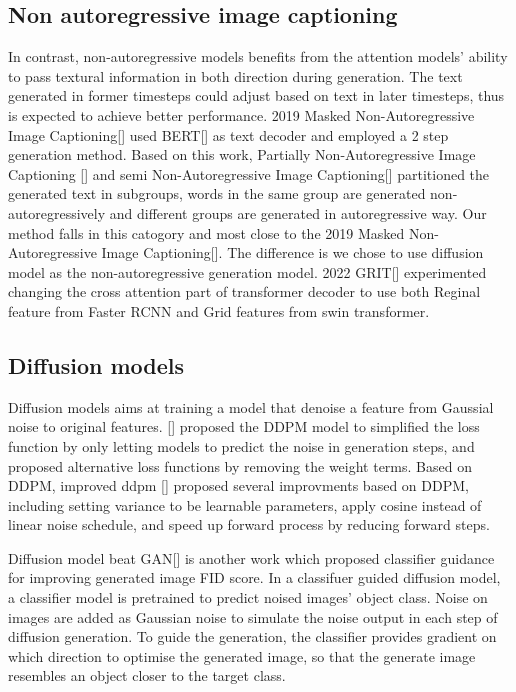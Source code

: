 \documentclass{article}
\begin{document}
\subsection{Non autoregressive image captioning}
In contrast, non-autoregressive models benefits from the attention models' ability to pass textural information in both direction during generation. The text generated in former timesteps could adjust based on text in later timesteps, thus is expected to achieve better performance. 2019 Masked Non-Autoregressive Image Captioning[] used BERT[] as text decoder and employed a 2 step generation method. Based on this work, Partially Non-Autoregressive Image Captioning [] and semi Non-Autoregressive Image Captioning[] partitioned the generated text in subgroups, words in the same group are generated non-autoregressively and different groups are generated in autoregressive way. Our method falls in this catogory and most close to the 2019 Masked Non-Autoregressive Image Captioning[]. The difference is we chose to use diffusion model as the non-autoregressive generation model. 2022 GRIT[] experimented changing the cross attention part of transformer decoder to use both Reginal feature from Faster RCNN and Grid features from swin transformer. 

\subsection{Diffusion models}
Diffusion models aims at training a model that denoise a feature from Gaussial noise to original features.
[] proposed the DDPM model to simplified the loss function by only letting models to predict the noise in generation steps, and proposed alternative loss functions by removing the weight terms. Based on DDPM, improved ddpm [] proposed several improvments based on DDPM, including setting variance to be learnable parameters, apply cosine instead of linear noise schedule, and speed up forward process by reducing forward steps. 

Diffusion model beat GAN[] is another work which proposed classifier guidance for improving generated image FID score. In a classifuer guided diffusion model, a classifier model is pretrained to predict noised images' object class. Noise on images are added as Gaussian noise to simulate the noise output in each step of diffusion generation. To guide the generation, the classifier provides gradient on which direction to optimise the generated image, so that the generate image resembles an object closer to the target class.
\end{document}
